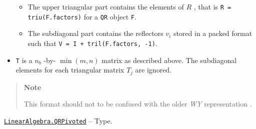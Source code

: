 \begin{adjustwidth}{2em}{0pt}
\begin{itemize}
\begin{itemize}
\item The upper triangular part contains the elements of  \(R\) , that is \texttt{R = triu(F.factors)} for a \texttt{QR} object \texttt{F}.


\item The subdiagonal part contains the reflectors  \(v_i\)  stored in a packed format such that \texttt{V = I + tril(F.factors, -1)}.

\end{itemize}

\item \texttt{T} is a  \(n_b\) -by- \(\min(m,n)\)  matrix as described above. The subdiagonal elements for each triangular matrix  \(T_j\)  are ignored.

\end{itemize}
\begin{quote}
\textbf{Note}

This format should not to be confused with the older \emph{WY} representation \footnotemark[2].

\end{quote}


\end{adjustwidth}
\hypertarget{1950169381798525185}{} 
\hyperlink{1950169381798525185}{\texttt{LinearAlgebra.QRPivoted}}  -- {Type.}

